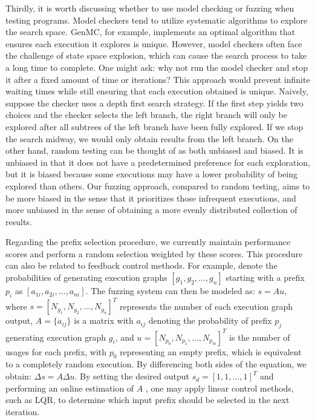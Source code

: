 Thirdly, it is worth discussing whether to use model checking or fuzzing when testing programs. Model checkers tend to utilize systematic algorithms to explore the search space. GenMC, for example, implements an optimal algorithm that ensures each execution it explores is unique. However, model checkers often face the challenge of state space explosion, which can cause the search process to take a long time to complete. One might ask: why not run the model checker and stop it after a fixed amount of time or iterations? This approach would prevent infinite waiting times while still ensuring that each execution obtained is unique.
Naively, suppose the checker uses a depth first search strategy. If the first step yields two choices and the checker selects the left branch, the right branch will only be explored after all subtrees of the left branch have been fully explored. If we stop the search midway, we would only obtain results from the left branch. On the other hand, random testing can be thought of as both unbiased and biased. It is unbiased in that it does not have a predetermined preference for each exploration, but it is biased because some executions may have a lower probability of being explored than others. Our fuzzing approach, compared to random testing, aims to be more biased in the sense that it prioritizes those infrequent executions, and more unbiased in the sense of obtaining a more evenly distributed collection of results.




Regarding the prefix selection procedure, we currently maintain performance scores and perform a random selection weighted by these scores. This procedure can also be related to feedback control methods. For example, denote the probabilities of generating execution graphs \([g_1, g_2, \ldots, g_n]\) starting with a prefix \(p_i\) as \([a_{1i}, a_{2i}, \ldots, a_{ni}]\). The fuzzing system can then be modeled as: $ s = Au$, where \(s = [N_{g_1}, N_{g_2}, \ldots, N_{g_n}]^T\) represents the number of each execution graph output, \(A = \{ a_{ij} \}\) is a matrix with \(a_{ij}\) denoting the probability of prefix \(p_j\) generating execution graph \(g_i\), and \(u = [N_{p_0}, N_{p_1}, \ldots, N_{p_m}]^T\) is the number of usages for each prefix, with \(p_0\) representing an empty prefix, which is equivalent to a completely random execution. By differencing both sides of the equation, we obtain: $\Delta s = A \Delta u$. By setting the desired output \(s_d = [1, 1, \ldots, 1]^T\) and performing an online estimation of \(A\) \cite{goodwinadaptive}, one may apply linear control methods, such as LQR, to determine which input prefix should be selected in the next iteration.



